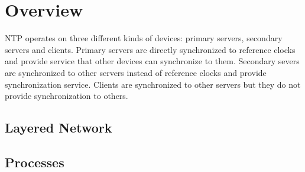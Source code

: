 \chapter{Overview}
NTP operates on three different kinds of devices: primary servers, secondary
servers and clients. Primary servers are directly synchronized to reference
clocks and provide service that other devices can synchronize to them.
Secondary severs are synchronized to other servers instead of reference clocks
and provide synchronization service. Clients are synchronized to other servers
but they do not provide synchronization to others.

\section{Layered Network}
\label{sec:Layered_network}


\section{Processes}
\label{sec:processes}




